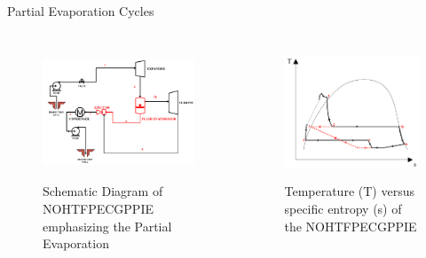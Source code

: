\begin{frame}{Partial Evaporation Cycles}
\begin{columns}
    \begin{figure}[h]
      \centering
      \includegraphics[height=4cm]{images/nohtfpecgppiepe.png}
      \caption{\scriptsize Schematic Diagram of NOHTFPECGPPIE emphasizing the Partial Evaporation}
   \end{figure}
    \begin{figure}[h]
    \centering
    \includegraphics[height=4cm]{images/nohtfpecgppietsdiagram2.png}
    \caption{\scriptsize Temperature (T) versus specific entropy (s) of the NOHTFPECGPPIE}
    \end{figure}
\end{columns}
\end{frame}


